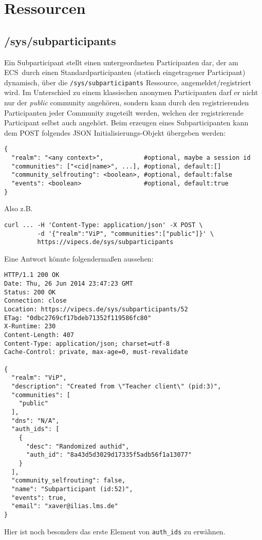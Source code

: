 \documentclass[12pt,a4paper]{article}
\newcommand{\ecs}{ECS}
\begin{document}
\section{Ressourcen}
\subsection{/sys/subparticipants}
Ein Subparticipant stellt einen untergeordneten Participanten dar, der am \ecs\
durch einen Standardparticipanten (statisch eingetragener Participant)
dynamisch, über die \texttt{/sys/subparticipants} Ressource,
angemeldet/registriert wird. Im Unterschied zu einem klassischen anonymen
Participanten darf er nicht nur der \textit{public} community angehören,
sondern kann durch den registrierenden Participanten jeder Community zugeteilt
werden, welchen der registrierende Participant selbst auch angehört. Beim
erzeugen eines Subparticipanten kann dem POST folgendes JSON
Initialisierungs-Objekt übergeben werden: 
\begin{verbatim}
{
  "realm": "<any context>",           #optional, maybe a session id
  "communities": ["<cid|name>", ...], #optional, default:[]
  "community_selfrouting": <boolean>, #optional, default:false
  "events": <boolean>                 #optional, default:true
}
\end{verbatim}
Also z.B.
\begin{verbatim}
curl ... -H 'Content-Type: application/json' -X POST \
         -d '{"realm":"ViP", "communities":["public"]}' \
         https://vipecs.de/sys/subparticipants
\end{verbatim}
Eine Antwort könnte folgendermaßen aussehen:
\begin{verbatim}
HTTP/1.1 200 OK
Date: Thu, 26 Jun 2014 23:47:23 GMT
Status: 200 OK
Connection: close
Location: https://vipecs.de/sys/subparticipants/52
ETag: "0dbc2769cf17bdeb71352f119586fc80"
X-Runtime: 230
Content-Length: 407
Content-Type: application/json; charset=utf-8
Cache-Control: private, max-age=0, must-revalidate

{
  "realm": "ViP",
  "description": "Created from \"Teacher client\" (pid:3)",
  "communities": [
    "public"
  ],
  "dns": "N/A",
  "auth_ids": [
    {
      "desc": "Randomized authid",
      "auth_id": "8a43d5d3029d17335f5adb56f1a13077"
    }
  ],
  "community_selfrouting": false,
  "name": "Subparticipant (id:52)",
  "events": true,
  "email": "xaver@ilias.lms.de"
}
\end{verbatim}
Hier ist noch besonders das erste Element von \texttt{auth\_ids} zu erwähnen.
\end{document}
